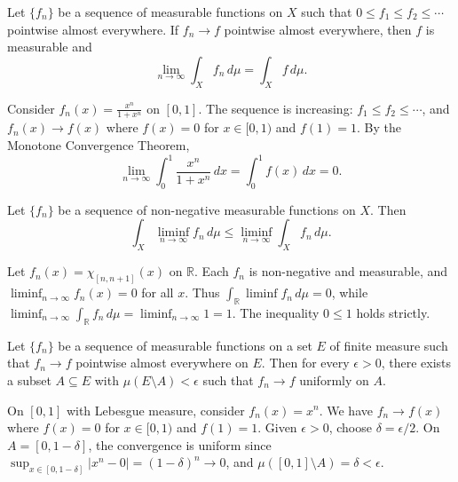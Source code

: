 \begin{theorem}
Let $\{f_n\}$ be a sequence of measurable functions on $X$ such that $0 \leq f_1 \leq f_2 \leq \cdots$ pointwise almost everywhere. If $f_n \to f$ pointwise almost everywhere, then $f$ is measurable and
\[
\lim_{n \to \infty} \int_X f_n \, d\mu = \int_X f \, d\mu.
\]
\end{theorem}

\begin{example}
Consider $f_n(x) = \frac{x^n}{1+x^n}$ on $[0,1]$. The sequence is increasing: $f_1 \leq f_2 \leq \cdots$, and $f_n(x) \to f(x)$ where $f(x) = 0$ for $x \in [0,1)$ and $f(1) = 1$. By the Monotone Convergence Theorem,
\[
\lim_{n \to \infty} \int_0^1 \frac{x^n}{1+x^n} \, dx = \int_0^1 f(x) \, dx = 0.
\]
\end{example}

\begin{theorem}
Let $\{f_n\}$ be a sequence of non-negative measurable functions on $X$. Then
\[
\int_X \liminf_{n \to \infty} f_n \, d\mu \leq \liminf_{n \to \infty} \int_X f_n \, d\mu.
\]
\end{theorem}

\begin{example}
Let $f_n(x) = \chi_{[n, n+1]}(x)$ on $\mathbb{R}$. Each $f_n$ is non-negative and measurable, and $\liminf_{n \to \infty} f_n(x) = 0$ for all $x$. Thus $\int_{\mathbb{R}} \liminf f_n \, d\mu = 0$, while $\liminf_{n \to \infty} \int_{\mathbb{R}} f_n \, d\mu = \liminf_{n \to \infty} 1 = 1$. The inequality $0 \leq 1$ holds strictly.
\end{example}

\begin{theorem}
Let $\{f_n\}$ be a sequence of measurable functions on a set $E$ of finite measure such that $f_n \to f$ pointwise almost everywhere on $E$. Then for every $\epsilon > 0$, there exists a subset $A \subseteq E$ with $\mu(E \setminus A) < \epsilon$ such that $f_n \to f$ uniformly on $A$.
\end{theorem}

\begin{example}
On $[0,1]$ with Lebesgue measure, consider $f_n(x) = x^n$. We have $f_n \to f(x)$ where $f(x) = 0$ for $x \in [0,1)$ and $f(1) = 1$. Given $\epsilon > 0$, choose $\delta = \epsilon/2$. On $A = [0, 1-\delta]$, the convergence is uniform since $\sup_{x \in [0,1-\delta]} |x^n - 0| = (1-\delta)^n \to 0$, and $\mu([0,1] \setminus A) = \delta < \epsilon$.
\end{example}

